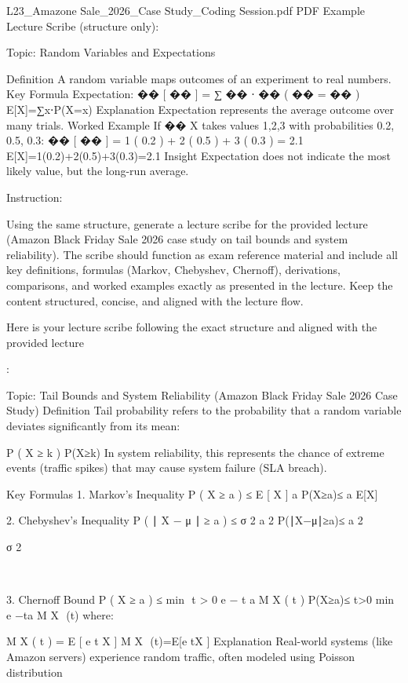 



L23_Amazone Sale_2026_Case Study_Coding Session.pdf
PDF
Example Lecture Scribe (structure only):

Topic: Random Variables and Expectations

Definition
A random variable maps outcomes of an experiment to real numbers.
Key Formula
Expectation:
��
[
��
]
=
∑
��
⋅
��
(
��
=
��
)
E[X]=∑x⋅P(X=x)
Explanation
Expectation represents the average outcome over many trials.
Worked Example
If 
��
X takes values {1,2,3} with probabilities {0.2, 0.5, 0.3}:
��
[
��
]
=
1
(
0.2
)
+
2
(
0.5
)
+
3
(
0.3
)
=
2.1
E[X]=1(0.2)+2(0.5)+3(0.3)=2.1
Insight
Expectation does not indicate the most likely value, but the long-run average.

Instruction:

Using the same structure, generate a lecture scribe for the provided lecture (Amazon Black Friday Sale 2026 case study on tail bounds and system reliability). The scribe should function as exam reference material and include all key definitions, formulas (Markov, Chebyshev, Chernoff), derivations, comparisons, and worked examples exactly as presented in the lecture. Keep the content structured, concise, and aligned with the lecture flow.

Here is your lecture scribe following the exact structure and aligned with the provided lecture 

:

Topic: Tail Bounds and System Reliability (Amazon Black Friday Sale 2026 Case Study)
Definition
Tail probability refers to the probability that a random variable deviates significantly from its mean:

P
(
X
≥
k
)
P(X≥k)
In system reliability, this represents the chance of extreme events (traffic spikes) that may cause system failure (SLA breach).

Key Formulas
1. Markov’s Inequality
P
(
X
≥
a
)
≤
E
[
X
]
a
P(X≥a)≤ 
a
E[X]
​
 
2. Chebyshev’s Inequality
P
(
∣
X
−
μ
∣
≥
a
)
≤
σ
2
a
2
P(∣X−μ∣≥a)≤ 
a 
2
 
σ 
2
 
​
 
3. Chernoff Bound
P
(
X
≥
a
)
≤
min
⁡
t
>
0
e
−
t
a
M
X
(
t
)
P(X≥a)≤ 
t>0
min
​
 e 
−ta
 M 
X
​
 (t)
where:

M
X
(
t
)
=
E
[
e
t
X
]
M 
X
​
 (t)=E[e 
tX
 ]
Explanation
Real-world systems (like Amazon servers) experience random traffic, often modeled using Poisson distribution 

